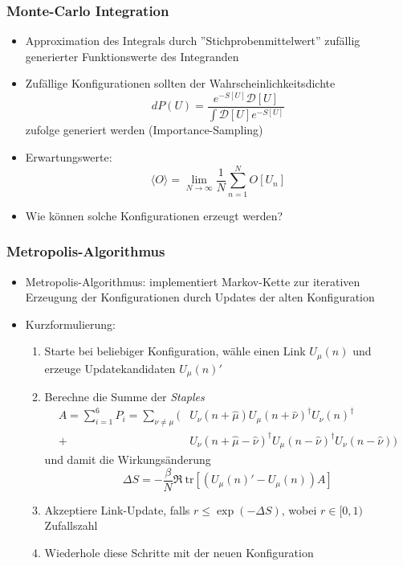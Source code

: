 \documentclass[10pt]{beamer}
\begin{document}
\begin{frame}
    \frametitle{Monte-Carlo Integration}
    \begin{itemize}
        \item Approximation des Integrals durch ''Stichprobenmittelwert'' zufällig generierter Funktionswerte des Integranden
        \item Zufällige Konfigurationen sollten der Wahrscheinlichkeitsdichte
        \begin{equation}
dP(U) = \frac{e^{-S[U]}\mathcal{D}[U]}{\int \mathcal{D}[U] e^{-S[U]}}
\end{equation}
zufolge generiert werden (Importance-Sampling)
		\item Erwartungswerte:
		\begin{equation}
\langle O \rangle = \lim_{N \rightarrow \infty} \frac{1}{N} \sum_{n = 1}^N O[U_n]
\end{equation}
		\item Wie können solche Konfigurationen erzeugt werden?
    \end{itemize}
\end{frame}

\begin{frame}
    \frametitle{Metropolis-Algorithmus}
    \begin{itemize}
        \item Metropolis-Algorithmus: implementiert Markov-Kette zur iterativen Erzeugung der Konfigurationen durch Updates der alten Konfiguration
        \item Kurzformulierung:
        \begin{enumerate}
        	\item Starte bei beliebiger Konfiguration, wähle einen Link $U_{\mu}(n)$ und erzeuge Updatekandidaten $U_{\mu}(n)'$
        	\item Berechne die Summe der \emph{Staples}
        	\begin{align}
				A = \sum_{i=1}^6 P_i = \sum_{\nu \neq \mu} \big( &U_{\nu}(n+\hat{\mu}) U_{\mu}(n+\hat{\nu})^{\dagger} U_{\nu}(n)^{\dagger}\\
		+ &U_{\nu}(n+\hat{\mu}-\hat{\nu})^{\dagger} U_{\mu}(n-\hat{\nu})^{\dagger} U_{\nu}(n-\hat{\nu}) \big)
			\end{align}
			und damit die Wirkungsänderung
			\begin{equation}
				\Delta S = -\frac{\beta}{N} \Re\ \text{tr} [ (U_{\mu}(n)' - U_{\mu}(n)) A]
			\end{equation}
			\item Akzeptiere Link-Update, falls $r \leq \exp(-\Delta S)$, wobei $r \in [0,1)$ Zufallszahl
			\item Wiederhole diese Schritte mit der neuen Konfiguration
        \end{enumerate}
    \end{itemize}
\end{frame}
\end{document}
